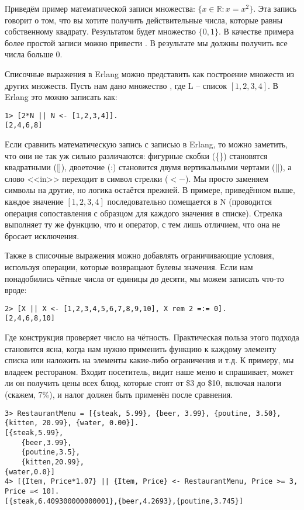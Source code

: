 Приведём пример математической записи множества: $\{x \in 
\mathbb{R}: x = x^2\}$.
Эта запись говорит о том, что вы хотите получить действительные числа, которые равны собственному квадрату.
Результатом будет множество $\{0, 1\}$.
В качестве примера более простой записи можно привести .
В результате мы должны получить все числа больше 0.

Списочные выражения в Erlang можно представить как построение множеств из других множеств.
Пусть нам дано множество , где L \--- список $[1, 2, 3, 4]$.
В Erlang это можно записать как:\\ 
\begin{lstlisting}[style=repl]
1> [2*N || N <- [1,2,3,4]].
[2,4,6,8]
\end{lstlisting}

Если сравнить математическую запись с записью в Erlang, то можно заметить, что они не так уж сильно различаются: фигурные скобки (\{\}) становятся квадратными ([]), двоеточие (:) становится двумя вертикальными чертами (||), а слово <<in>> переходит в символ стрелки ($<-$).
Мы просто заменяем символы на другие, но логика остаётся прежней.
В примере, приведённом выше, каждое значение $[1, 2, 3, 4]$ последовательно помещается в N (проводится операция сопоставления с образцом для каждого значения в списке).
Стрелка выполняет ту же функцию, что и оператор\ops{=}, с тем лишь отличием, что она не бросает исключения.

Также в списочные выражения можно добавлять ограничивающие условия, используя операции, которые возвращают булевы значения.
Если нам понадобились чётные числа от единицы до десяти, мы можем записать что\--то вроде:
\begin{lstlisting}[style=repl]
2> [X || X <- [1,2,3,4,5,6,7,8,9,10], X rem 2 =:= 0].
[2,4,6,8,10]
\end{lstlisting}

Где конструкция  проверяет число на чётность.
Практическая польза этого подхода становится ясна, когда нам нужно применить функцию к каждому элементу списка или наложить на элементы какие\--либо ограничения и т.д.
К примеру, мы владеем рестораном.
Входит посетитель, видит наше меню и спрашивает, может ли он получить цены всех блюд, которые стоят от \$3 до \$10, включая налоги (скажем, 7\%), и налог должен быть применён после сравнения.
\begin{lstlisting}[style=repl]
3> RestaurantMenu = [{steak, 5.99}, {beer, 3.99}, {poutine, 3.50}, {kitten, 20.99}, {water, 0.00}].
[{steak,5.99},
    {beer,3.99},
    {poutine,3.5},
    {kitten,20.99},
{water,0.0}]
4> [{Item, Price*1.07} || {Item, Price} <- RestaurantMenu, Price >= 3, Price =< 10].
[{steak,6.409300000000001},{beer,4.2693},{poutine,3.745}]
\end{lstlisting}

